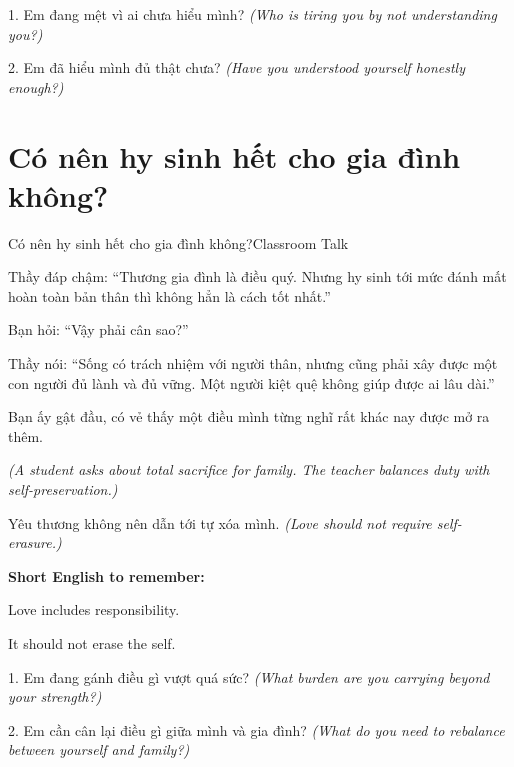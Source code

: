 \begin{tuhocnhanh}
1. Em đang mệt vì ai chưa hiểu mình? \textit{(Who is tiring you by not understanding you?)}

2. Em đã hiểu mình đủ thật chưa? \textit{(Have you understood yourself honestly enough?)}
\end{tuhocnhanh}
\ngancach

\section{Có nên hy sinh hết cho gia đình không?}
\begin{truyen}{Có nên hy sinh hết cho gia đình không?}{Classroom Talk}

Thầy đáp chậm: ``Thương gia đình là điều quý. Nhưng hy sinh tới mức đánh mất hoàn toàn bản thân thì không hẳn là cách tốt nhất.''

Bạn hỏi: ``Vậy phải cân sao?''

Thầy nói: ``Sống có trách nhiệm với người thân, nhưng cũng phải xây được một con người đủ lành và đủ vững. Một người kiệt quệ không giúp được ai lâu dài.''

Bạn ấy gật đầu, có vẻ thấy một điều mình từng nghĩ rất khác nay được mở ra thêm.

\textit{(A student asks about total sacrifice for family. The teacher balances duty with self-preservation.)}
\end{truyen}

\begin{baihoc}
Yêu thương không nên dẫn tới tự xóa mình.
\textit{(Love should not require self-erasure.)}
\end{baihoc}

\begin{ghinhoanh}
\textbf{Short English to remember:}

Love includes responsibility.

It should not erase the self.
\end{ghinhoanh}

\begin{tuhocnhanh}
1. Em đang gánh điều gì vượt quá sức? \textit{(What burden are you carrying beyond your strength?)}

2. Em cần cân lại điều gì giữa mình và gia đình? \textit{(What do you need to rebalance between yourself and family?)}
\end{tuhocnhanh}
\ngancach

